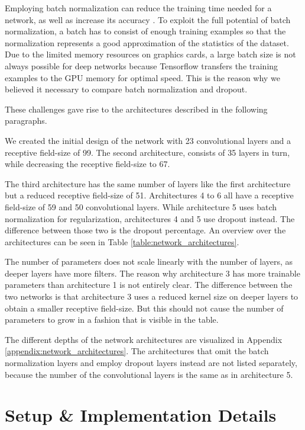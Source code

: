 Employing batch normalization can reduce the training time needed for a network, as well as increase its accuracy \cite{batch_normalization}. To exploit the full potential of batch normalization, a batch has to consist of enough training examples so that the normalization represents a good approximation of the statistics of the dataset. Due to the limited memory resources on graphics cards, a large batch size is not always possible for deep networks because Tensorflow transfers the training examples to the GPU memory for optimal speed. This is the reason why we believed it necessary to compare batch normalization and dropout.

These challenges gave rise to the architectures described in the following paragraphs.

We created the initial design of the network with 23 convolutional layers and a receptive field-size of 99. The second architecture, consists of 35 layers in turn, while decreasing the receptive field-size to 67. 

The third architecture has the same number of layers like the first architecture but a reduced receptive field-size of 51. Architectures 4 to 6 all have a receptive field-size of 59 and 50 convolutional layers. While architecture 5 uses batch normalization for regularization, architectures 4 and 5 use dropout instead. The difference between those two is the dropout percentage. An overview over the architectures can be seen in Table \ref{table:network_architectures}. 

The number of parameters does not scale linearly with the number of layers, as deeper layers have more filters. The reason why architecture 3 has more trainable parameters than architecture 1 is not entirely clear. The difference between the two networks is that architecture 3 uses a reduced kernel size on deeper layers to obtain a smaller receptive field-size. But this should not cause the number of parameters to grow in a fashion that is visible in the table.

The different depths of the network architectures are visualized in Appendix \ref{appendix:network_architectures}. The architectures that omit the batch normalization layers and employ dropout layers instead are not listed separately, because the number of the convolutional layers is the same as in architecture 5.

\section{Setup \& Implementation Details}

